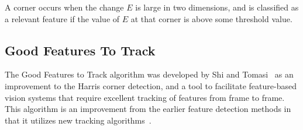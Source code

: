 \documentclass[11pt, oneside, reqno]{book}
\begin{document}
A corner occurs when the change $E$ is large in two dimensions, and is classified as a relevant feature if the value of $E$ at that corner is above some threshold value.



\subsection{Good Features To Track}
\label{ssec:goodFeaturesToTrack}
The Good Features to Track algorithm was developed by Shi and Tomasi~\cite{tomasi1994good} as an improvement to the Harris corner detection, and a tool to facilitate feature-based vision systems that require excellent tracking of features from frame to frame. This algorithm is an improvement from the earlier feature detection methods in that it utilizes new tracking algorithms~\cites{tomasi1994good,opencvfeaturedetection}.
\end{document}
